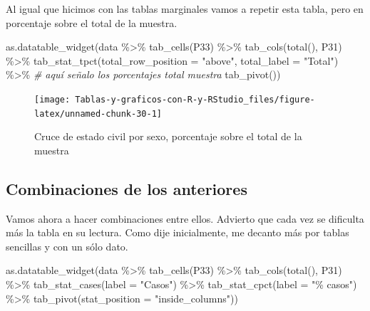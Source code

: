 \documentclass[
]{book}
\newenvironment{Shaded}{\begin{snugshade}}{\end{snugshade}}
\newcommand{\AttributeTok}[1]{\textcolor[rgb]{0.77,0.63,0.00}{#1}}
\newcommand{\CommentTok}[1]{\textcolor[rgb]{0.56,0.35,0.01}{\textit{#1}}}
\newcommand{\FunctionTok}[1]{\textcolor[rgb]{0.00,0.00,0.00}{#1}}
\newcommand{\NormalTok}[1]{#1}
\newcommand{\SpecialCharTok}[1]{\textcolor[rgb]{0.00,0.00,0.00}{#1}}
\newcommand{\StringTok}[1]{\textcolor[rgb]{0.31,0.60,0.02}{#1}}
\begin{document}
Al igual que hicimos con las tablas marginales vamos a repetir esta tabla, pero en porcentaje sobre el total de la muestra.

\begin{Shaded}
\begin{Highlighting}[]
\FunctionTok{as.datatable\_widget}\NormalTok{(data }\SpecialCharTok{\%\textgreater{}\%}
    \FunctionTok{tab\_cells}\NormalTok{(P33) }\SpecialCharTok{\%\textgreater{}\%}
    \FunctionTok{tab\_cols}\NormalTok{(}\FunctionTok{total}\NormalTok{(), P31) }\SpecialCharTok{\%\textgreater{}\%}
    \FunctionTok{tab\_stat\_tpct}\NormalTok{(}\AttributeTok{total\_row\_position =} \StringTok{"above"}\NormalTok{, }\AttributeTok{total\_label =} \StringTok{"Total"}\NormalTok{) }\SpecialCharTok{\%\textgreater{}\%} \CommentTok{\# aquí señalo los porcentajes total muestra}
    \FunctionTok{tab\_pivot}\NormalTok{())}
\end{Highlighting}
\end{Shaded}

\begin{figure}[H]

{\centering \texttt{[image: Tablas-y-graficos-con-R-y-RStudio\_files/figure-latex/unnamed-chunk-30-1]} 

}

\caption{Cruce de estado civil por sexo, porcentaje sobre el total de la muestra}\label{fig:unnamed-chunk-30}
\end{figure}

\hypertarget{combinaciones-de-los-anteriores}{%
\subsection{Combinaciones de los anteriores}\label{combinaciones-de-los-anteriores}}

Vamos ahora a hacer combinaciones entre ellos. Advierto que cada vez se dificulta más la tabla en su lectura. Como dije inicialmente, me decanto más por tablas sencillas y con un sólo dato.

\begin{Shaded}
\begin{Highlighting}[]
\FunctionTok{as.datatable\_widget}\NormalTok{(data }\SpecialCharTok{\%\textgreater{}\%}
  \FunctionTok{tab\_cells}\NormalTok{(P33) }\SpecialCharTok{\%\textgreater{}\%}
  \FunctionTok{tab\_cols}\NormalTok{(}\FunctionTok{total}\NormalTok{(), P31) }\SpecialCharTok{\%\textgreater{}\%}
  \FunctionTok{tab\_stat\_cases}\NormalTok{(}\AttributeTok{label =} \StringTok{"Casos"}\NormalTok{) }\SpecialCharTok{\%\textgreater{}\%}
  \FunctionTok{tab\_stat\_cpct}\NormalTok{(}\AttributeTok{label =} \StringTok{"\% casos"}\NormalTok{) }\SpecialCharTok{\%\textgreater{}\%}
  \FunctionTok{tab\_pivot}\NormalTok{(}\AttributeTok{stat\_position =} \StringTok{"inside\_columns"}\NormalTok{))}
\end{Highlighting}
\end{Shaded}
\end{document}
